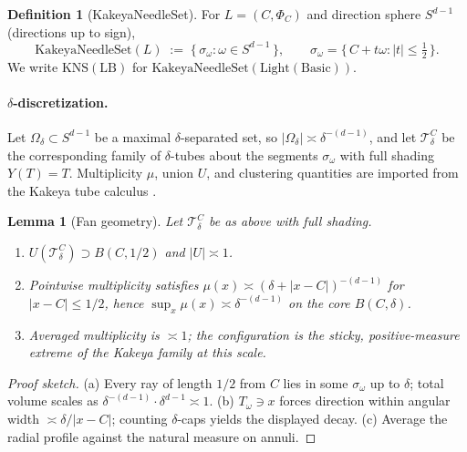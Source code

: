 \documentclass[11pt]{amsart}
\theoremstyle{plain}
\newtheorem{lemma}[theorem]{Lemma}
\theoremstyle{definition}
\newtheorem{definition}[theorem]{Definition}
\begin{document}
\begin{definition}[KakeyaNeedleSet]
\label{def:kns}
For $L=(C,\Phi_C)$ and direction sphere $S^{d-1}$ (directions up to sign),
\begin{equation}
  \mathrm{KakeyaNeedleSet}(L)
  \;:=\;
  \{\,\sigma_\omega : \omega\in S^{d-1}\,\},
  \qquad
  \sigma_\omega = \{\,C+t\omega : |t|\le \tfrac12\,\}.
\end{equation}
We write $\mathrm{KNS}(\mathrm{LB})$ for
$\mathrm{KakeyaNeedleSet}(\mathrm{Light}(\mathrm{Basic}))$.
\end{definition}

\paragraph{$\delta$-discretization.}
Let $\Omega_\delta\subset S^{d-1}$ be a maximal $\delta$-separated set, so
$|\Omega_\delta|\asymp \delta^{-(d-1)}$, and let $\mathcal{T}^C_\delta$ be the
corresponding family of $\delta$-tubes about the segments $\sigma_\omega$ with
full shading $Y(T)=T$. Multiplicity $\mu$, union $U$, and clustering quantities
are imported from the Kakeya tube calculus
\cite{GuthWangZahl2026Streamlined}.

\begin{lemma}[Fan geometry]
\label{lem:fan}
Let $\mathcal{T}^C_\delta$ be as above with full shading.
\begin{enumerate}[label=(\alph*)]
  \item $U(\mathcal{T}^C_\delta)\supset B(C,1/2)$ and $|U|\asymp 1$.
  \item Pointwise multiplicity satisfies
  $\mu(x)\asymp (\delta+|x-C|)^{-(d-1)}$ for $|x-C|\le 1/2$, hence
  $\sup_x \mu(x)\asymp \delta^{-(d-1)}$ on the core $B(C,\delta)$.
  \item Averaged multiplicity is $\asymp 1$; the configuration is the sticky,
  positive-measure extreme of the Kakeya family at this scale.
\end{enumerate}
\end{lemma}

\begin{proof}[Proof sketch]
(a) Every ray of length $1/2$ from $C$ lies in some $\sigma_\omega$ up to
$\delta$; total volume scales as
$\delta^{-(d-1)}\cdot\delta^{d-1}\asymp 1$.
(b) $T_\omega\ni x$ forces direction within angular width $\asymp\delta/|x-C|$;
counting $\delta$-caps yields the displayed decay.
(c) Average the radial profile against the natural measure on annuli.
\end{proof}
\end{document}
